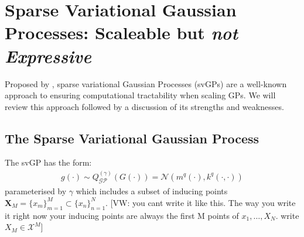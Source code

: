 \documentclass{article}
\newcommand{\vw}[1]{{\color{green} [VW: #1]}}
\newcommand{\GP}{\operatorname{\mathcal{GP}}}
\numberwithin{equation}{section}
\begin{document}
\section{Sparse Variational Gaussian Processes: Scaleable but \textit{not Expressive}}\label{section:the-svgp}






Proposed by \cite{titsias2009variational}, sparse variational Gaussian Processes (svGPs) are a well-known approach to ensuring computational tractability when scaling GPs. We will review this approach followed by a discussion of its strengths and weaknesses.




\subsection{The Sparse Variational Gaussian Process}



The svGP has the form:
\begin{align}
g(\cdot) \sim Q^{(\gamma)}_{\GP}(G(\cdot)) = \mathcal{N}\left(m^{q}(\cdot), k^{q}(\cdot, \cdot)\right)
\label{svgp}
\end{align}
parameterised by $\gamma$ which includes a subset of inducing points $\mathbf{X}_M = \{x_m\}_{m=1}^{M} \subset \{x_n\}_{n=1}^{N}$. \vw{you cant write it like this. The way you write it right now your inducing points are always the first M points of $x_1,\hdots,X_N$. write $X_M \in \mathcal{X}^M$}
\end{document}
